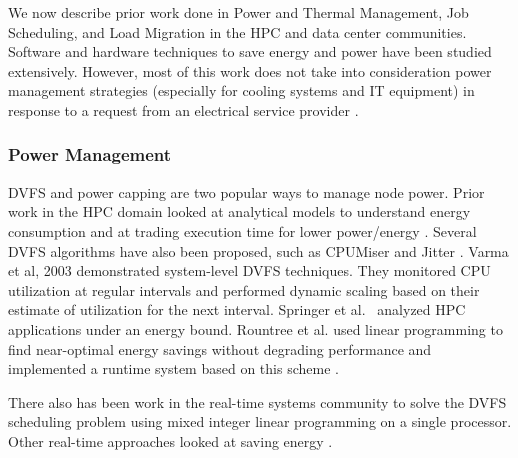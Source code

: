 We now describe prior work done in Power and Thermal Management, Job Scheduling, and Load Migration in the HPC and data center communities. Software and hardware techniques to save energy and power have been studied extensively. However, most of this work does not take into consideration power management strategies (especially for cooling systems and IT equipment) in response to a request from an electrical service provider \cite{Ghatikar2012a}.

\subsubsection{Power Management}
DVFS and power capping are two popular ways to manage node power. Prior work in the HPC domain looked at analytical models to understand energy consumption \cite{SpringerPPoPP2006,GeICPP2007,LiHPCA2006} and at trading execution time for lower power/energy \cite{CameronSC2005,HsuSC2005}. Several DVFS algorithms have also been proposed, such as CPUMiser \cite{GeICPP2007} and Jitter \cite{KappiahSC2005}. Varma et al, 2003 \cite{varma_control-theoretic_2003} demonstrated system-level DVFS techniques. They monitored CPU utilization at regular intervals and performed dynamic scaling based on their estimate of utilization for the next interval. Springer et al.~\cite{springer:06} analyzed HPC applications under an energy bound. Rountree et al. used linear programming to find near-optimal energy savings without degrading performance \cite{rountree:07} and implemented a runtime system based on this scheme \cite{rountree:09}. 

There also has been work in the real-time systems community to solve the DVFS scheduling problem using mixed integer linear programming on a single processor\cite{IshiharaISLPED1998,SaputraLCTES2002,SwaminathanRTSS2000,SwaminathanASPDAC2001}. Other real-time approaches looked at saving energy \cite{MoncusiRTSS2003,MochockiICCAD2002,MochockiRTAS2005,ZhuTPDS2003,ZhangDAC2002}. 


